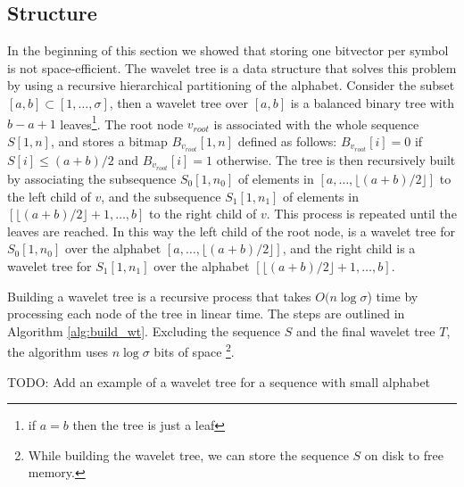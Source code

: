 \subsection{Structure}

In the beginning of this section we showed that storing one bitvector per symbol is not space-efficient. The wavelet tree is a data structure that solves this problem by using a recursive hierarchical partitioning of the alphabet. Consider the subset $[a,b] \subset [1, \dots, \sigma]$, then a wavelet tree over $[a,b]$ is a balanced binary tree with $b-a+1$ leaves\footnote{if $a=b$ then the tree is just a leaf}. The root node $v_{root}$ is associated with the whole sequence $S[1,n]$, and stores a bitmap $B_{v_{root}}[1,n]$ defined as follows: $B_{v_{root}}[i] = 0$ if $S[i] \leq (a+b)/2$ and $B_{v_{root}}[i] = 1$ otherwise. The tree is then recursively built by associating the subsequence $S_0[1,n_0]$ of elements in $[a, \dots,\lfloor (a+b)/2 \rfloor ]$ to the left child of $v$, and the subsequence $S_1[1,n_1]$ of elements in $[\lfloor (a+b)/2 \rfloor +1,\dots, b]$ to the right child of $v$. This process is repeated until the leaves are reached. In this way the left child of the root node, is a wavelet tree for $S_0[1,n_0]$ over the alphabet $[a,\dots, \lfloor (a+b)/2 \rfloor ]$, and the right child is a wavelet tree for $S_1[1,n_1]$ over the alphabet $[\lfloor (a+b)/2 \rfloor +1,\dots, b]$. \cite{WTForALL} \vspace{0.4cm}

\noindent Building a wavelet tree is a recursive process that takes $O(n\log \sigma$) time by processing each node of the tree in linear time. The steps are outlined in Algorithm \ref{alg:build_wt}. Excluding the sequence $S$ and the final wavelet tree $T$, the algorithm uses $n \log \sigma$ bits of space \footnote{While building the wavelet tree, we can store the sequence $S$ on disk to free memory.}. \vspace{0.4cm}
\begin{example}
    TODO: Add an example of a wavelet tree for a sequence with small alphabet
\end{example}

